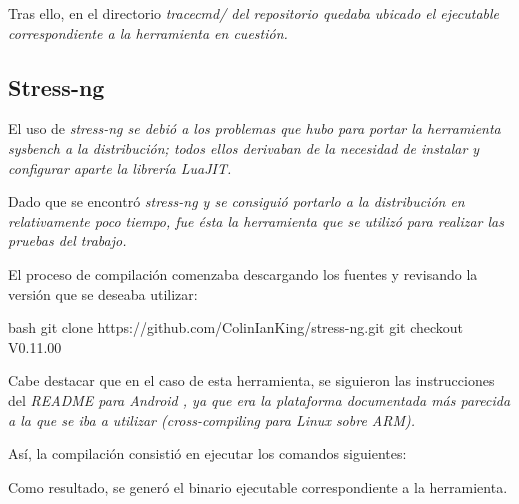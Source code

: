 \documentclass[../main.tex]{subfiles}
\begin{document}
Tras ello, en el directorio \it{tracecmd/} del repositorio quedaba ubicado el ejecutable correspondiente a la herramienta en cuestión.

\subsection{Stress-ng}

El uso de \it{stress-ng} se debió a los problemas que hubo para portar la herramienta \it{sysbench} a la distribución; todos ellos derivaban de la necesidad de instalar y configurar aparte la librería \it{LuaJIT}.

Dado que se encontró \it{stress-ng} y se consiguió portarlo a la distribución en relativamente poco tiempo, fue ésta la herramienta que se utilizó para realizar las pruebas del trabajo.

El proceso de compilación comenzaba descargando los fuentes y revisando la versión que se deseaba utilizar:
\begin{codigo}{bash}
git clone https://github.com/ColinIanKing/stress-ng.git
git checkout V0.11.00
\end{codigo}

Cabe destacar que en el caso de esta herramienta, se siguieron las instrucciones del \it{README} para Android \cite{documentacion-stress-ng-android}, ya que era la plataforma documentada más parecida a la que se iba a utilizar (cross-compiling para Linux sobre ARM).

Así, la compilación consistió en ejecutar los comandos siguientes:

Como resultado, se generó el binario ejecutable correspondiente a la herramienta.
\end{document}
